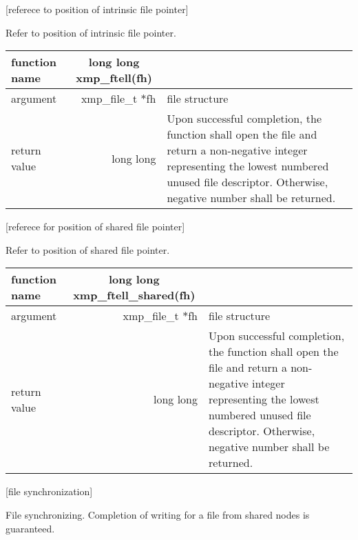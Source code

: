    [referece to position of intrinsic file pointer]

   Refer to position of intrinsic file pointer.
   \begin{table}[h]
    \begin{center}
     \begin{tabular}{l|r|p{70mm}}
      \hline
      {\bf function name}  & \multicolumn{1}{c}{\bf long long
      xmp\_ftell(fh)} &  \\ \hline
      argument & xmp\_file\_t $*$fh & file structure \\ \hline
      return value & long long & Upon successful completion, the
	      function shall open the file and return a non-negative
	      integer representing the lowest numbered unused file
	      descriptor. Otherwise, negative number shall be
	      returned. \\ \hline
      \end{tabular}
     \end{center}
    \label{tb:aaa}
   \end{table}
   

   
   [referece for position of shared file pointer]

   Refer to position of shared file pointer.
   \begin{table}[h]
    \begin{center}
     \begin{tabular}{l|r|p{70mm}}
      \hline
      {\bf function name}  & \multicolumn{1}{c}{\bf long long
      xmp\_ftell\_shared(fh)} &  \\ \hline
      argument & xmp\_file\_t $*$fh & file structure \\ \hline
      return value & long long & Upon successful completion, the
	      function shall open the file and return a non-negative
	      integer representing the lowest numbered unused file
	      descriptor. Otherwise, negative number shall be
	      returned. \\ \hline
      \end{tabular}
     \end{center}
    \label{tb:aaa}
   \end{table}
   
   

   [file synchronization]

   File synchronizing.
   Completion of writing for a file from shared nodes is guaranteed.

